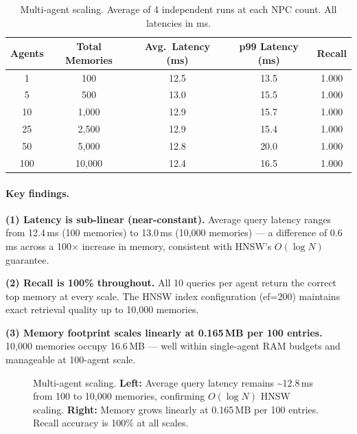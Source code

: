 \documentclass{article}
\begin{document}
\begin{table}[h]
\centering
\caption{Multi-agent scaling.  Average of 4 independent runs at each NPC count.
  All latencies in ms.}
\label{tab:scaling}
\begin{tabular}{ccccc}
\toprule
Agents & Total Memories & Avg.\ Latency (ms) & p99 Latency (ms) & Recall \\
\midrule
1    & 100    & 12.5 & 13.5 & 1.000 \\
5    & 500    & 13.0 & 15.5 & 1.000 \\
10   & 1,000  & 12.9 & 15.7 & 1.000 \\
25   & 2,500  & 12.9 & 15.4 & 1.000 \\
50   & 5,000  & 12.8 & 20.0 & 1.000 \\
100  & 10,000 & 12.4 & 16.5 & 1.000 \\
\bottomrule
\end{tabular}
\end{table}

\paragraph{Key findings.}
\textbf{(1) Latency is sub-linear (near-constant).}  Average query latency ranges
from 12.4\,ms (100 memories) to 13.0\,ms (10,000 memories) — a difference
of 0.6\,ms across a 100$\times$ increase in memory, consistent with HNSW's
$O(\log N)$ guarantee.

\textbf{(2) Recall is 100\% throughout.}  All 10 queries per agent return the
correct top memory at every scale.  The HNSW index configuration (ef=200)
maintains exact retrieval quality up to 10,000 memories.

\textbf{(3) Memory footprint scales linearly at 0.165\,MB per 100 entries.}
10,000 memories occupy 16.6\,MB — well within single-agent RAM budgets and
manageable at 100-agent scale.

\begin{figure}[h]
\centering
{}
\caption{Multi-agent scaling.  \textbf{Left:} Average query latency remains
  \textasciitilde{}12.8\,ms from 100 to 10,000 memories, confirming $O(\log N)$ HNSW
  scaling.  \textbf{Right:} Memory grows linearly at 0.165\,MB per 100 entries.
  Recall accuracy is 100\% at all scales.}
\label{fig:scaling}
\end{figure}
\end{document}
